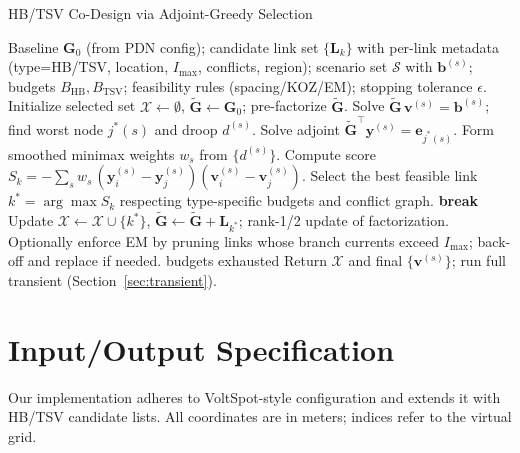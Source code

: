\documentclass[conference]{IEEEtran}
\begin{document}
\begin{algorithm}[t]
\caption{HB/TSV Co-Design via Adjoint-Greedy Selection}
\label{alg:hbtsv}
\begin{algorithmic}[1]
\REQUIRE Baseline $\bm{G}_0$ (from PDN config); candidate link set $\{\bm{L}_k\}$ with per-link metadata (type=HB/TSV, location, $I_{\max}$, conflicts, region); scenario set $\mathcal{S}$ with $\bm{b}^{(s)}$; budgets $B_{\text{HB}},B_{\text{TSV}}$; feasibility rules (spacing/KOZ/EM); stopping tolerance $\epsilon$.
\STATE Initialize selected set $\mathcal{X}\leftarrow\emptyset$, $\widetilde{\bm{G}}\leftarrow\bm{G}_0$; pre-factorize $\widetilde{\bm{G}}$.
\REPEAT
    \STATE Solve $\widetilde{\bm{G}}\,\bm{v}^{(s)}=\bm{b}^{(s)}$; find worst node $j^*(s)$ and droop $d^{(s)}$.
    \STATE Solve adjoint $\widetilde{\bm{G}}^\top \bm{y}^{(s)}=\bm{e}_{j^*(s)}$.
  \ENDFOR
  \STATE Form smoothed minimax weights $w_s$ from $\{d^{(s)}\}$.
    \STATE Compute score $S_k=-\sum_{s} w_s\,(\bm{y}^{(s)}_i-\bm{y}^{(s)}_j)(\bm{v}^{(s)}_i-\bm{v}^{(s)}_j)$.
  \ENDFOR
  \STATE Select the best feasible link $k^*=\arg\max S_k$ respecting type-specific budgets and conflict graph.
   \STATE \textbf{break} \ENDIF
  \STATE Update $\mathcal{X}\leftarrow \mathcal{X}\cup\{k^*\}$, $\widetilde{\bm{G}}\leftarrow \widetilde{\bm{G}}+\bm{L}_{k^*}$; rank-1/2 update of factorization.
  \STATE Optionally enforce EM by pruning links whose branch currents exceed $I_{\max}$; back-off and replace if needed.
\UNTIL budgets exhausted
\STATE Return $\mathcal{X}$ and final $\{\bm{v}^{(s)}\}$; run full transient (Section~\ref{sec:transient}).
\end{algorithmic}
\end{algorithm}

\section{Input/Output Specification}
Our implementation adheres to VoltSpot-style configuration and extends it with HB/TSV candidate lists. All coordinates are in meters; indices refer to the virtual grid.
\end{document}
